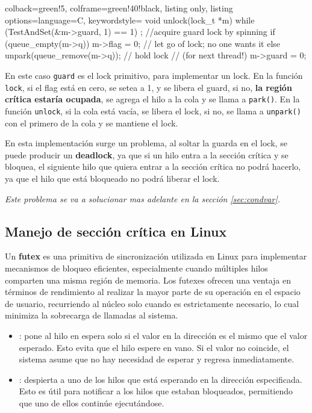 \documentclass[openany]{book}
\begin{document}
\begin{enumerate}
\begin{tcblisting}{colback=green!5, colframe=green!40!black, listing only, listing options={language=C, keywordstyle=\color{blue!35!white}\bfseries}}
    void unlock(lock_t *m) {
        while (TestAndSet(&m->guard, 1) == 1)
            ; //acquire guard lock by spinning
        if (queue_empty(m->q))
            m->flag = 0; // let go of lock; no one wants it
        else
            unpark(queue_remove(m->q)); // hold lock
            // (for next thread!)
            m->guard = 0;
    }
    \end{tcblisting}
    En este caso \texttt{guard} es el lock primitivo, para implementar un lock. En la función \texttt{lock}, si el flag está en cero, se setea a 1, y se libera el guard, si no, \textbf{la región crítica estaría ocupada}, se agrega el hilo a la cola y se llama a \texttt{park()}. En la función \texttt{unlock}, si la cola está vacía, se libera el lock, si no, se llama a \texttt{unpark()} con el primero de la cola y se mantiene el lock.

    En esta implementación surge un problema, al soltar la guarda en el lock, se puede producir un \textbf{deadlock}, ya que si un hilo entra a la sección crítica y se bloquea, el siguiente hilo que quiera entrar a la sección crítica no podrá hacerlo, ya que el hilo que está bloqueado no podrá liberar el lock.
\end{enumerate}

\textit{Este problema se va a solucionar mas adelante en la sección \ref{sec:condvar}.}

\subsection{Manejo de sección crítica en Linux}

Un \textbf{futex} es una primitiva de sincronización utilizada en Linux para implementar mecanismos de bloqueo eficientes, especialmente cuando múltiples hilos comparten una misma región de memoria. Los futexes ofrecen una ventaja en términos de rendimiento al realizar la mayor parte de su operación en el espacio de usuario, recurriendo al núcleo solo cuando es estrictamente necesario, lo cual minimiza la sobrecarga de llamadas al sistema.

\begin{itemize}
    \item {}: pone al hilo en espera solo si el valor en la dirección es el mismo que el valor esperado. Esto evita que el hilo espere en vano. Si el valor no coincide, el sistema asume que no hay necesidad de esperar y regresa inmediatamente.
    \item {}: despierta a uno de los hilos que está esperando en la dirección especificada. Esto es útil para notificar a los hilos que estaban bloqueados, permitiendo que uno de ellos continúe ejecutándose.
\end{itemize}
\end{document}
